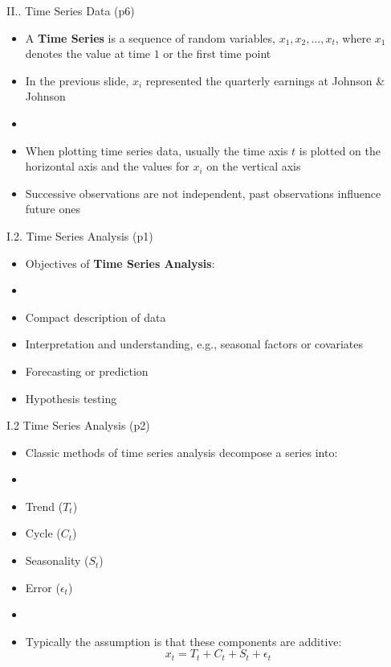 \documentclass[handout]{beamer}
\newcommand{\stronger}[1]{\textbf{\color{purple} #1}}
\begin{document}
\begin{frame}{II.. Time Series Data (p6)}
\begin{itemize}
\item A \stronger{Time Series} is a sequence of random variables, $x_1, x_2, \ldots, x_t$, where $x_1$ denotes the value at time $1$ or the first time point
\item In the previous slide, $x_i$ represented the quarterly earnings at Johnson \& Johnson
\item[]
\item When plotting time series data, usually the time axis $t$ is plotted on the horizontal axis and the values for $x_i$ on the vertical axis
\item Successive observations are not independent, past observations influence future ones
\end{itemize}
\end{frame}
\begin{frame}{I.2. Time Series Analysis (p1)}
\begin{itemize}
\item[] Objectives of \stronger{Time Series Analysis}:
\item[]
\item Compact description of data
\item Interpretation and understanding, e.g., seasonal factors or covariates
\item Forecasting or prediction
\item Hypothesis testing
\end{itemize}
\end{frame}
\begin{frame}{I.2 Time Series Analysis (p2)}
\begin{itemize}
\item[] Classic methods of time series analysis decompose a series into:
\item[]
\item Trend ($T_t$)
\item Cycle ($C_t$)
\item Seasonality ($S_t$)
\item Error ($\epsilon_t$)
\item[]
\item Typically the assumption is that these components are additive:
\[
	x_t = T_t+C_t+S_t+ \epsilon_t
\]
\end{itemize}
\end{frame}
\end{document}
